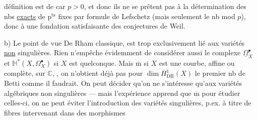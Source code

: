 définition est de car $p>0$, et donc ils ne se prêtent pas à la détermination des nbs \uline{exacts} de p$^{\mathrm{ts}}$ fixes par formule de Lefschetz (mais seulement le nb mod $p$), donc  à une fondation satisfaisante des conjectures de Weil.

b) Le point de vue De Rham classique,  est trop exclusivement lié aux variétés \uline{non} singulières. Rien n'empêche évidemment de considérer aussi le complexe $\underline\Omega_X^\bullet$ et $\mathbb H^*(X,\Omega_X^\bullet)$ si $X$ est quelconque. Mais $\overline{\mathrm m}$ si $X$ est une courbe, affine ou complète, sur $\mathbb C$,
, on n'obtient déjà pas pour  $\dim H_{\mathrm{DR}}^1(X)$ le premier nb de Betti comme il faudrait.
On peut décider qu'on ne s'intéresse qu'aux variétés algébriques non singulières — mais l'expérience apprend que $\overline{\mathrm m}$ pour étudier celles-ci, on ne peut éviter l'introduction des variétés singulières, p.ex. à titre de fibres intervenant dans des  morphismes
